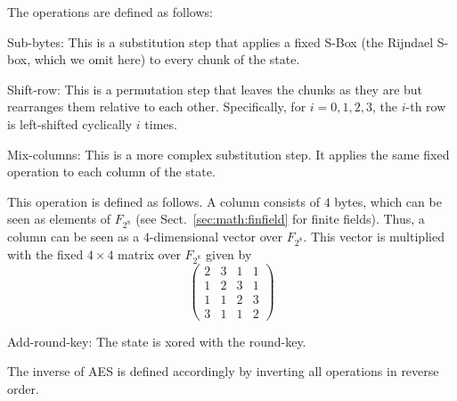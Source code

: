 The operations are defined as follows:
\begin{compactenum}
  \item Sub-bytes: This is a substitution step that applies a fixed S-Box (the Rijndael S-box, which we omit here) to every chunk of the state.
  \item Shift-row: This is a permutation step that leaves the chunks as they are but rearranges them relative to each other.
    Specifically, for $i=0,1,2,3$, the $i$-th row is left-shifted cyclically $i$ times.
  \item Mix-columns: This is a more complex substitution step.
    It applies the same fixed operation to each column of the state.
    
    This operation is defined as follows.
    A column consists of $4$ bytes, which can be seen as elements of $F_{2^8}$ (see Sect.~\ref{sec:math:finfield} for finite fields).
    Thus, a column can be seen as a $4$-dimensional vector over $F_{2^8}$.
    This vector is multiplied with the fixed $4\times 4$ matrix over $F_{2^8}$ given by
\[\left(\begin{matrix}
    2&3&1&1\\1&2&3&1\\1&1&2&3\\3&1&1&2
   \end{matrix}\right)\]
  \item Add-round-key: The state is xored with the round-key.   
\end{compactenum}

The inverse of AES is defined accordingly by inverting all operations in reverse order.

